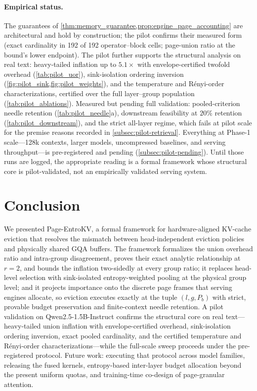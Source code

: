 \documentclass[final,5p,times,twocolumn]{elsarticle}
\theoremstyle{definition}
\theoremstyle{remark}
\newcommand{\method}{Page-EntroKV}
\begin{document}
\paragraph{Empirical status.}
The guarantees of \cref{thm:memory_guarantee,prop:engine_page_accounting}
are architectural and hold by construction; the pilot confirms their
measured form (exact cardinality in 192 of 192 operator--block cells;
page-union ratio at the bound's lower endpoint). The pilot further
supports the structural analysis on real text: heavy-tailed inflation
up to $5.1\times$ with envelope-certified twofold overhead
(\cref{tab:pilot_uor}), sink-isolation ordering inversion
(\cref{fig:pilot_sink,fig:pilot_weights}), and the temperature and
R\'enyi-order characterizations, certified over the full layer--group
population (\cref{tab:pilot_ablations}). Measured but pending full
validation: pooled-criterion needle retention
(\cref{tab:pilot_needle}a), downstream feasibility at $20\%$ retention
(\cref{tab:pilot_downstream}), and the strict all-layer regime, which
fails at pilot scale for the premise reasons recorded in
\cref{subsec:pilot-retrieval}. Everything at Phase-1 scale---128k
contexts, larger models, uncompressed baselines, and serving
throughput---is pre-registered and pending
(\cref{subsec:pilot-pending}). Until those runs are logged, the
appropriate reading is a formal framework whose structural core is
pilot-validated, not an empirically validated serving system.

\section{Conclusion}
\label{sec:conclusion}

We presented \method{}, a formal framework for hardware-aligned
KV-cache eviction that resolves the mismatch between head-independent
eviction policies and physically shared GQA buffers. The framework
formalizes the union overhead ratio and intra-group disagreement,
proves their exact analytic relationship at $r=2$, and bounds the
inflation two-sidedly at every group ratio; it replaces head-level
selection with sink-isolated entropy-weighted pooling at the physical
group level; and it projects importance onto the discrete page frames
that serving engines allocate, so eviction executes exactly at the
tuple $(l, g, P_b)$ with strict, provable budget preservation and
finite-context needle retention. A pilot validation on
Qwen2.5-1.5B-Instruct confirms the structural core on real
text---heavy-tailed union inflation with envelope-certified overhead,
sink-isolation ordering inversion, exact pooled cardinality, and the
certified temperature and R\'enyi-order characterizations---while the
full-scale sweep proceeds under the pre-registered protocol. Future
work: executing that protocol across model families, releasing the
fused kernels, entropy-based inter-layer budget allocation beyond the
present uniform quotas, and training-time co-design of page-granular
attention.
\end{document}
